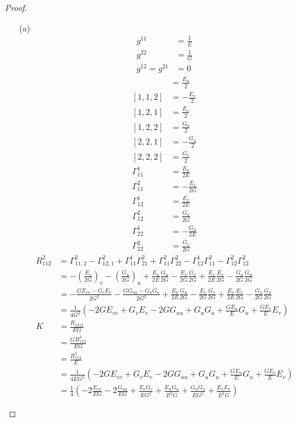 \documentclass[10pt,a4paper]{article}
\begin{document}
\begin{proof}
\begin{enumerate}
\item[(a)]
\begin{align*}
g^{11}&=\frac{1}{E}\\
g^{22}&=\frac{1}{G}\\
g^{12}=g^{21}&=0
\end{align*}
\begin{align*}
[1,1,1]&=\frac{E_u}{2}\\
[1,1,2]&=-\frac{E_v}{2}\\
[1,2,1]&=\frac{E_v}{2}\\
[1,2,2]&=\frac{G_u}{2}\\
[2,2,1]&=-\frac{G_u}{2}\\
[2,2,2]&=\frac{G_v}{2}\\
\Gamma_{11}^1&=\frac{E_u}{2E}\\
\Gamma_{11}^2&=-\frac{E_v}{2G}\\
\Gamma_{12}^1&=\frac{E_v}{2E}\\
\Gamma_{12}^2&=\frac{G_u}{2G}\\
\Gamma_{22}^1&=-\frac{G_u}{2E}\\
\Gamma_{22}^2&=\frac{G_v}{2G}
\end{align*}
\begin{align*}
R_{112}^2&=\Gamma_{11,2}^2-\Gamma_{12,1}^2+\Gamma_{11}^1\Gamma_{21}^2+\Gamma_{11}^2\Gamma_{22}^2-\Gamma_{12}^1\Gamma_{11}^2-\Gamma_{12}^2\Gamma_{12}^2\\
&=-\left(\frac{E_v}{2G}\right)_v-\left(\frac{G_u}{2G}\right)_u+
\frac{E_u}{2E}\frac{G_u}{2G}-\frac{E_v}{2G}\frac{G_v}{2G}+\frac{E_v}{2E}\frac{E_v}{2G}-\frac{G_u}{2G}\frac{G_u}{2G}\\
&=-\frac{GE_{vv}-G_vE_v}{2G^2}-\frac{GG_{uu}-G_uG_u}{2G^2}+
\frac{E_u}{2E}\frac{G_u}{2G}-\frac{E_v}{2G}\frac{G_v}{2G}+\frac{E_v}{2E}\frac{E_v}{2G}-\frac{G_u}{2G}\frac{G_u}{2G}\\
&=\frac{1}{4G^2}\left(-2GE_{vv}+G_vE_v-2GG_{uu}+G_uG_u+\frac{GE_u}{E}G_u+\frac{GE_v}{E}E_v\right)\\
K&=\frac{R_{1212}}{EG}\\
&=\frac{GR_{112}^2}{EG}\\
&=\frac{R_{112}^2}{E}\\
&=\frac{1}{4EG^2}\left(-2GE_{vv}+G_vE_v-2GG_{uu}+G_uG_u+\frac{GE_u}{E}G_u+\frac{GE_v}{E}E_v\right)\\
&=\frac{1}{4}\left(-2\frac{E_{vv}}{EG}-2\frac{G_{uu}}{EG}+\frac{E_vG_v}{EG^2}+\frac{E_uG_u}{E^2G}+\frac{G_uG_u}{EG^2}+\frac{E_vE_v}{E^2G}\right)

\end{align*}
\end{enumerate}
\end{proof}
\end{document}
